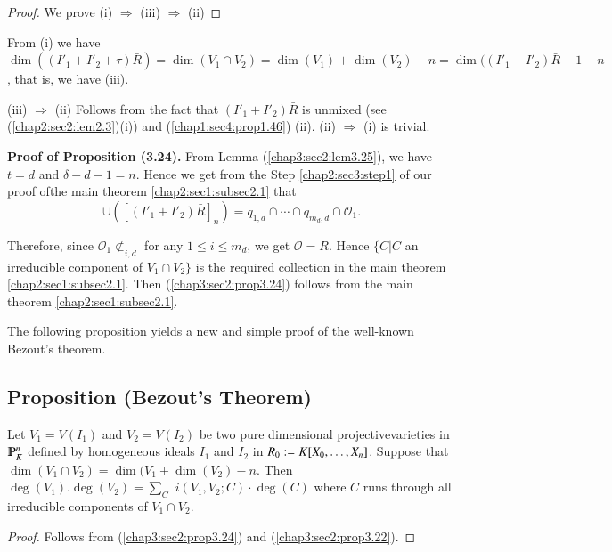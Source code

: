 \begin{proof}
  We prove (i) $\Rightarrow$ (iii) $\Rightarrow$ (ii) 
\end{proof}

From (i) we have $\dim ((I'_1+I'_2+ \tau ) \bar{R})=\dim (V_1\cap
V_2)= \dim (V_1)+ \dim (V_2)-n= \dim ((I'_1+I'_2)\bar{R}-1-n$, that
is, we have (iii). 

(iii) $\Rightarrow$ (ii) Follows from the fact that $
(I'_1+I'_2)\bar{R}$ is unmixed (see (\ref{chap2:sec2:lem2.3})(i)) and
(\ref{chap1:sec4:prop1.46}) (ii). (ii) $\Rightarrow$ (i)  is trivial. 

\medskip
\noindent \textbf{Proof of Proposition (3.24).}
  From Lemma (\ref{chap3:sec2:lem3.25}), we have $t=d$ and
  $\delta-d-1=n$. Hence we get from 
  the Step \ref{chap2:sec3:step1} of our proof of\pageoriginale the
  main theorem \ref{chap2:sec1:subsec2.1} that   
  $$
  \cup ([(I'_1+I'_2)\bar{R}]_n) = q_{1,d}\cap \cdots \cap
  q_{m_{d},d}\cap \mathscr{O}_1.  
  $$

Therefore, since $\mathscr{O}_1 \not \subset _{i,d}$ for any $1 \leq i
\leq m_d$, we get $\mathscr{O}=\bar{R}$. Hence $\{ C|C $ an
irreducible component of  $V_1 \cap V_2\}$ is the required collection
in the main theorem \ref{chap2:sec1:subsec2.1}. Then
(\ref{chap3:sec2:prop3.24}) follows from the main theorem 
\ref{chap2:sec1:subsec2.1}. 

The following proposition yields a new and simple proof of the
well-known Bezout's  theorem. 

\setcounter{subsection}{25}
\subsection{Proposition (Bezout's Theorem)}\label{chap3:sec2:subsec3.26}

Let $ V_1= V(I_1)$ and $ V_2 =V(I_2)$  be two pure dimensional
projective\break varieties in $\varmathbb{P}_K^n$ 
defined by homogeneous ideals $I_1$ and $I_2$
in $ R_0:= K\break [X_0,\ldots,X_n]$. Suppose that 
$\dim (V_1\cap V_2) = \dim (V_1+ \dim (V_2)-n$. Then $ \deg
(V_1). \deg(V_2) = \sum\limits_C$ \break $i (V_1,V_2; C) \cdot \deg (C) $
where $C$ runs through all irreducible components
  of  $V_1 \cap V_2$. 

\begin{proof}
  Follows from (\ref{chap3:sec2:prop3.24}) and (\ref{chap3:sec2:prop3.22}).   
\end{proof}

